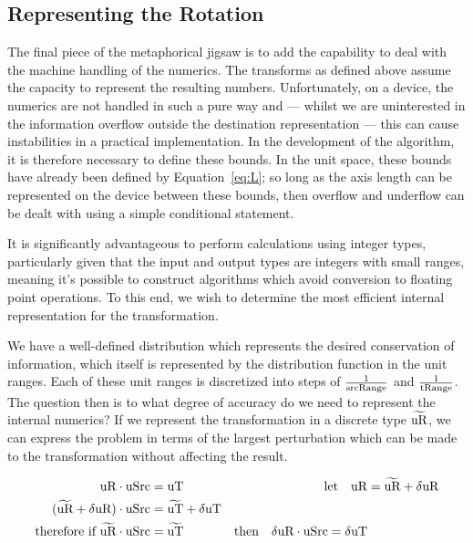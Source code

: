 \subsection{Representing the Rotation}

The final piece of the metaphorical jigsaw is to add the capability to deal with the machine handling of the numerics. The transforms as defined above assume the capacity to represent the resulting numbers. Unfortunately, on a device, the numerics are not handled in such a pure way and --- whilst we are uninterested in the information overflow outside the destination representation --- this can cause instabilities in a practical implementation. In the development of the algorithm, it is therefore necessary to define these bounds. In the unit space, these bounds have already been defined by Equation~\ref{eq:L}; so long as the axis length can be represented on the device between these bounds, then overflow and underflow can be dealt with using a simple conditional statement.

It is significantly advantageous to perform calculations using integer types, particularly given that the input and output types are integers with small ranges, meaning it's possible to construct algorithms which avoid conversion to floating point operations. To this end, we wish to determine the most efficient internal representation for the transformation.

We have a well-defined distribution which represents the desired conservation of information, which itself is represented by the distribution function in the unit ranges. Each of these unit ranges is discretized into steps of $\frac{1}{\text{srcRange}}$ and $\frac{1}{\text{tRange}}$. The question then is to what degree of accuracy do we need to represent the internal numerics? If we represent the transformation in a discrete type $\widetilde{\text{uR}}$, we can express the problem in terms of the largest perturbation which can be made to the transformation without affecting the result.


\begin{equation}\label{eq:lxyPixel}
\begin{aligned}
\text{uR}  \cdot \text{uSrc} &= \text{uT}  &\text{let} \quad \text{uR} &= \widetilde{\text{uR}} + \delta\text{uR} \\
(\widetilde{\text{uR}} + \delta\text{uR})  \cdot \text{uSrc} &= \widetilde{\text{uT}} + \delta\text{uT} \\
\text{therefore if } \widetilde{\text{uR}} \cdot \text{uSrc} &= \widetilde{\text{uT}} & \text{then}\quad \delta\text{uR}  \cdot \text{uSrc} = \delta\text{uT}
\end{aligned} 
\end{equation}


